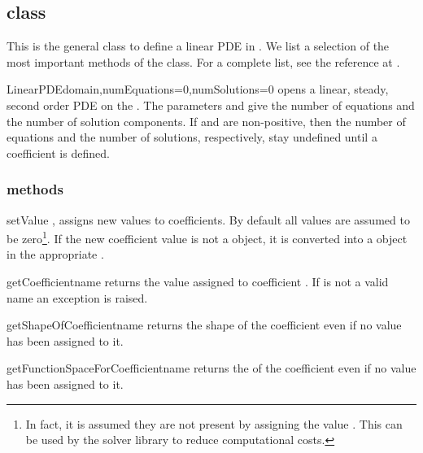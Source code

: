\subsection{\LinearPDE class}
This is the general class to define a linear PDE in \escript.
We list a selection of the most important methods of the class.
For a complete list, see the reference at \ReferenceGuide.

\begin{classdesc}{LinearPDE}{domain,numEquations=0,numSolutions=0}
opens a linear, steady, second order PDE on the \Domain {}.
The parameters  and  give the number of
equations and the number of solution components.
If  and  are non-positive, then the number
of equations and the number of solutions, respectively, stay undefined until a
coefficient is defined.
\end{classdesc}

\subsubsection{\LinearPDE methods}
\begin{methoddesc}[LinearPDE]{setValue}{
,
}
assigns new values to coefficients. By default all values are assumed to be
zero\footnote{In fact, it is assumed they are not present by assigning the
value . This can be used by the solver library to reduce
computational costs.}.
If the new coefficient value is not a \Data object, it is converted into a
\Data object in the appropriate \FunctionSpace.
\end{methoddesc}

\begin{methoddesc}[LinearPDE]{getCoefficient}{name}
returns the value assigned to coefficient . If  is not a
valid name an exception is raised.
\end{methoddesc}

\begin{methoddesc}[LinearPDE]{getShapeOfCoefficient}{name}
returns the shape of the coefficient  even if no value has been
assigned to it.
\end{methoddesc}

\begin{methoddesc}[LinearPDE]{getFunctionSpaceForCoefficient}{name}
returns the \FunctionSpace of the coefficient  even if no value has
been assigned to it.
\end{methoddesc}


